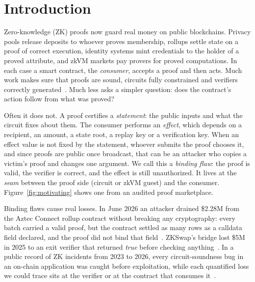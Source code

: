 \section{Introduction}\label{sec:intro}

Zero-knowledge (ZK) proofs now guard real money on public blockchains.
Privacy pools release deposits to whoever proves membership, rollups settle
state on a proof of correct execution, identity systems mint credentials to
the holder of a proved attribute, and zkVM markets pay provers for proved
computations. In each case a smart contract, the \emph{consumer}, accepts a
proof and then acts. Much work makes sure that proofs are sound, circuits
fully constrained and verifiers correctly
generated~\cite{sok-snark-bugs,picus,circomspect,zkap}. Much less asks a
simpler question: does the contract's action follow from what was proved?

Often it does not. A proof certifies a \emph{statement}: the public inputs
and what the circuit fixes about them. The consumer performs an
\emph{effect}, which depends on a recipient, an amount, a state root, a
replay key or a verification key. When an effect value is not fixed by the
statement, whoever submits the proof chooses it, and since proofs are public
once broadcast, that can be an attacker who copies a victim's proof and
changes one argument. We call this a \emph{binding flaw}: the proof is valid,
the verifier is correct, and the effect is still unauthorized.
It lives at the \emph{seam} between the proof side (circuit or zkVM guest) and
the consumer. Figure~\ref{fig:motivating} shows one from an audited proof
marketplace.

Binding flaws cause real losses. In June 2026 an attacker drained \$2.28M
from the Aztec Connect rollup contract without breaking any cryptography:
every batch carried a valid proof, but the contract settled as many rows as
a calldata field declared, and the proof did not bind that
field~\cite{aztec-connect-hack}. ZKSwap's bridge lost \$5M in 2025 to an
exit verifier that returned \emph{true} before checking
anything~\cite{zkswap-hack}. In a public record of ZK incidents from 2023 to
2026, every circuit-soundness bug in an on-chain application was caught
before exploitation, while each quantified loss we could trace sits at the
verifier or at the contract that consumes it~\cite{zkp-hacks-record}.


